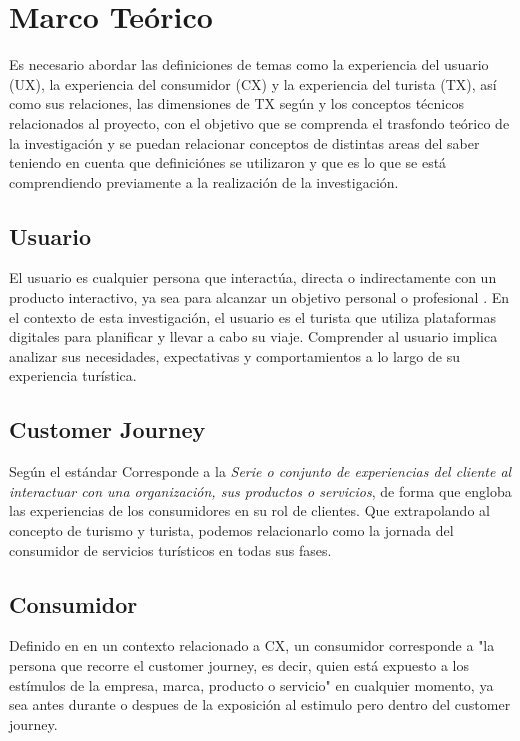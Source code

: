 \chapter{Marco Teórico}
\label{cha:marco_teorico}

Es necesario abordar las definiciones de temas como la experiencia del usuario (UX), la experiencia del consumidor (CX) y la experiencia del turista (TX), así como sus relaciones, las dimensiones de TX según \cite{kim2012development} y los conceptos técnicos relacionados al proyecto, con el objetivo que se comprenda el trasfondo teórico de la investigación y se puedan relacionar conceptos de distintas areas del saber teniendo en cuenta que definiciónes se utilizaron y que es lo que se está comprendiendo previamente a la realización de la investigación.

\section{Usuario}
\label{sec:usuario}

El usuario es cualquier persona que interactúa, directa o indirectamente con un producto interactivo, ya sea para alcanzar un objetivo personal o profesional \cite{preece2015interaction}. En el contexto de esta investigación, el usuario es el turista que utiliza plataformas digitales para planificar y llevar a cabo su viaje. Comprender al usuario implica analizar sus necesidades, expectativas y comportamientos a lo largo de su experiencia turística.

\section{Customer Journey}
Según el estándar \cite{ISO24082} Corresponde a la \textit{Serie o conjunto de experiencias del cliente al interactuar con una organización, sus productos o servicios}, de forma que engloba las experiencias de los consumidores en su rol de clientes. Que extrapolando al concepto de turismo y turista, podemos relacionarlo como la jornada del consumidor de servicios turísticos en todas sus fases.

\section{Consumidor}
\label{sec:consumidor}
Definido en \cite{becker2020customer} en un contexto relacionado a CX, un consumidor corresponde a  "la persona que recorre el customer journey, es decir, quien está expuesto a los estímulos de la empresa, marca, producto o servicio" en cualquier momento, ya sea antes durante o despues de la exposición al estimulo pero dentro del customer journey.

